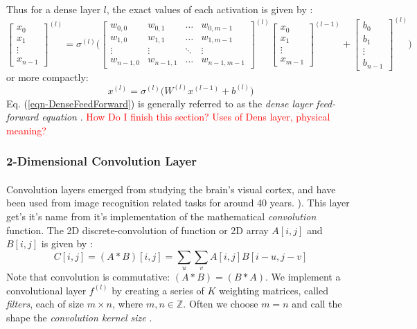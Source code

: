 \documentclass[12pt,letterpaper]{article}
\begin{document}
Thus for a dense layer $l$, the exact values of each activation is given by \cite{Geron,Loy}:
\begin{equation}
\begin{bmatrix}
x_0 \\ x_1 \\ \vdots \\ x_{n-1}
\end{bmatrix}^{(l)} =
\sigma^{(l)} \Bigg(
\begin{bmatrix}
w_{0,0} & w_{0,1} & \hdots & w_{0,m-1} \\
w_{1,0} & w_{1,1} & \hdots & w_{1,m-1} \\
\vdots & \vdots & \ddots & \vdots  \\
w_{n-1,0} & w_{n-1,1} & \hdots & w_{n-1,m-1} 
\end{bmatrix}^{(l)} 
\begin{bmatrix}
x_0 \\ x_1 \\ \vdots \\ x_{m-1}
\end{bmatrix}^{(l-1)} +
\begin{bmatrix}
b_0 \\ b_1 \\ \vdots \\ b_{n-1}
\end{bmatrix}^{(l)} \Bigg)
\end{equation}
or more compactly:
\begin{equation}
\label{eqn-DenseFeedForward}
x^{(l)} = \sigma^{(l)} \Big( W^{(l)} x^{(l-1)} + b^{(l)} \Big)
\end{equation}
Eq. (\ref{eqn-DenseFeedForward}) is generally referred to as the \textit{dense layer feed-forward equation} \cite{Goodfellow}. \textcolor{red}{How Do I finish this section? Uses of Dens layer, physical meaning?} 


\subsubsection{2-Dimensional Convolution Layer}
\label{subsubsec-Conv2DLayer}

\paragraph*{}Convolution layers emerged from studying the brain's visual cortex, and have been used from image recognition related tasks for around 40 years. \cite{Geron,Loy}). This layer get's it's name from it's implementation of the mathematical \textit{convolution} function. The 2D discrete-convolution of function or 2D array $A[i,j]$ and $B[i,j]$ is given by \cite{Goodfellow}:
\begin{equation}
\label{eqn-convolution}
C[i,j] = (A * B)[i,j] = \sum_{u}\sum_{v} A[i,j]B[i - u,j - v]
\end{equation}
Note that convolution is commutative: $(A * B) = (B * A)$. We implement a convolutional layer $f^{(l)}$ by creating a series of $K$ weighting matrices, called \textit{filters}, each of size $m \times n$, where $m,n \in \mathbb{Z}$. Often we choose $m = n$ and call the shape the \textit{convolution kernel size} \cite{Loy, Goodfellow}.
\end{document}
